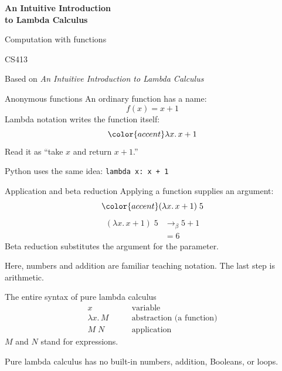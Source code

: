 \documentclass[aspectratio=169,11pt]{beamer}
\newcommand{\key}[1]{{\color{accent}#1}}
\begin{document}
\begin{frame}
\vspace{7mm}
{\Huge\bfseries An Intuitive Introduction\\[3mm]to Lambda Calculus\par}
\vspace{9mm}
{\Large Computation with functions\par}
\vspace{12mm}
{\normalsize CS413\par}
\vspace{3mm}
{\small Based on \emph{An Intuitive Introduction to Lambda Calculus}}
\end{frame}

\begin{frame}{Anonymous functions}
An ordinary function has a name:
\[f(x)=x+1\]
Lambda notation writes the function itself:
\[\key{\lambda x.\,x+1}\]
Read it as ``take $x$ and return $x+1$.''
\vspace{4mm}

Python uses the same idea: \quad\texttt{lambda x: x + 1}
\end{frame}

\begin{frame}{Application and beta reduction}
Applying a function supplies an argument:
\[\key{(\lambda x.\,x+1)\;5}\]
\begin{align*}
(\lambda x.\,x+1)\;5 &\longrightarrow_{\beta} 5+1 \\
&=6
\end{align*}
Beta reduction substitutes the argument for the parameter.
\vspace{5mm}

{\small Here, numbers and addition are familiar teaching notation. The last step is arithmetic.}
\end{frame}

\begin{frame}{The entire syntax of pure lambda calculus}
\begin{align*}
x &\qquad \text{variable}\\[3mm]
\lambda x.\,M &\qquad \text{abstraction (a function)}\\[3mm]
M\;N &\qquad \text{application}
\end{align*}
\vspace{3mm}
$M$ and $N$ stand for expressions.
\vspace{5mm}

Pure lambda calculus has no built-in numbers, addition, Booleans, or loops.
\end{frame}
\end{document}
